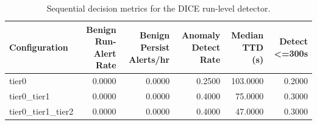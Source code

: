 \begin{table}[t]
\centering
\caption{Sequential decision metrics for the DICE run-level detector.}
\label{tab:dice_sequential_metrics}
\footnotesize
\begin{tabular}{lrrrrr}
\toprule
Configuration & Benign Run-Alert Rate & Benign Persist Alerts/hr & Anomaly Detect Rate & Median TTD (s) & Detect <=300s \\
\midrule
tier0 & 0.0000 & 0.0000 & 0.2500 & 103.0000 & 0.2000 \\
tier0_tier1 & 0.0000 & 0.0000 & 0.4000 & 75.0000 & 0.3000 \\
tier0_tier1_tier2 & 0.0000 & 0.0000 & 0.4000 & 47.0000 & 0.3000 \\
\bottomrule
\end{tabular}

\end{table}
